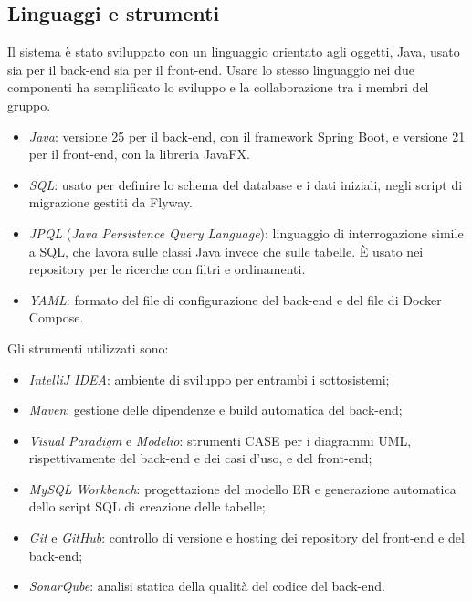 \subsection{Linguaggi e strumenti}
Il sistema è stato sviluppato con un linguaggio orientato agli oggetti, Java, usato sia per il back-end sia per il front-end. Usare lo stesso linguaggio nei due componenti ha semplificato lo sviluppo e la collaborazione tra i membri del gruppo.
\begin{itemize}
  \item \textit{Java}: versione 25 per il back-end, con il framework Spring Boot, e versione 21 per il front-end, con la libreria JavaFX.
  \item \textit{SQL}: usato per definire lo schema del database e i dati iniziali, negli script di migrazione gestiti da Flyway.
  \item \textit{JPQL} (\textit{Java Persistence Query Language}): linguaggio di interrogazione simile a SQL, che lavora sulle classi Java invece che sulle tabelle. È usato nei repository per le ricerche con filtri e ordinamenti.
  \item \textit{YAML}: formato del file di configurazione del back-end e del file di Docker Compose.
\end{itemize}
Gli strumenti utilizzati sono:
\begin{itemize}
  \item \textit{IntelliJ IDEA}: ambiente di sviluppo per entrambi i sottosistemi;
  \item \textit{Maven}: gestione delle dipendenze e build automatica del back-end;
  \item \textit{Visual Paradigm} e \textit{Modelio}: strumenti CASE per i diagrammi UML, rispettivamente del back-end e dei casi d'uso, e del front-end;
  \item \textit{MySQL Workbench}: progettazione del modello ER e generazione automatica dello script SQL di creazione delle tabelle;
  \item \textit{Git} e \textit{GitHub}: controllo di versione e hosting dei repository del front-end e del back-end;
  \item \textit{SonarQube}: analisi statica della qualità del codice del back-end.
\end{itemize}


